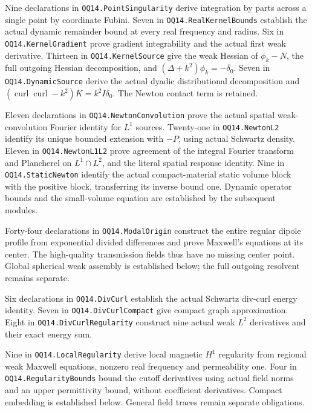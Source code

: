 Nine declarations in \texttt{OQ14.PointSingularity} derive integration by
parts across a single point by coordinate Fubini. Seven in
\texttt{OQ14.RealKernelBounds} establish the actual dynamic remainder
bound at every real frequency and radius. Six in
\texttt{OQ14.KernelGradient} prove gradient integrability and the actual
first weak derivative. Thirteen in \texttt{OQ14.KernelSource} give the
weak Hessian of $\phi_k-N$, the full outgoing Hessian decomposition,
and $(\Delta+k^2)\phi_k=-\delta_0$. Seven in
\texttt{OQ14.DynamicSource} derive the actual dyadic distributional
decomposition and $(\operatorname{curl}\operatorname{curl}-k^2)K
=k^2I\delta_0$. The Newton contact term is retained.

Eleven declarations in \texttt{OQ14.NewtonConvolution} prove the actual
spatial weak-convolution Fourier identity for $L^1$ sources. Twenty-one
in \texttt{OQ14.NewtonL2} identify its unique bounded extension with
$-P$, using actual Schwartz density. Eleven in
\texttt{OQ14.NewtonL1L2} prove agreement of the integral Fourier transform
and Plancherel on $L^1\cap L^2$, and the literal spatial response identity.
Nine in \texttt{OQ14.StaticNewton} identify the actual compact-material
static volume block with the positive block, transferring its inverse
bound one. Dynamic operator bounds and the small-volume equation are established
by the subsequent modules.

Forty-four declarations in \texttt{OQ14.ModalOrigin} construct the entire
regular dipole profile from exponential divided differences and prove
Maxwell's equations at its center. The high-quality transmission fields
thus have no missing center point. Global spherical weak assembly is established below; the full outgoing
resolvent remains separate.

Six declarations in \texttt{OQ14.DivCurl} establish the actual Schwartz
div-curl energy identity. Seven in \texttt{OQ14.DivCurlCompact} give
compact graph approximation. Eight in \texttt{OQ14.DivCurlRegularity}
construct nine actual weak $L^2$ derivatives and their exact energy sum.

Nine in \texttt{OQ14.LocalRegularity} derive local magnetic $H^1$
regularity from regional weak Maxwell equations, nonzero real frequency
and permeability one. Four in \texttt{OQ14.RegularityBounds} bound the
cutoff derivatives using actual field norms and an upper permittivity
bound, without coefficient derivatives. Compact embedding is established below. General field traces remain
separate obligations.

